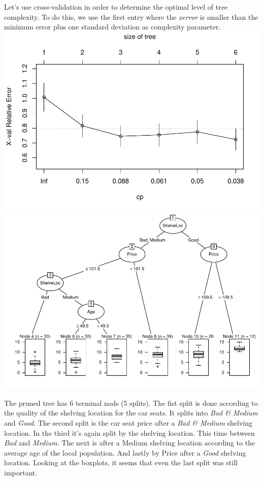 \documentclass[
]{article}
\begin{document}
Let's use cross-validation in order to determine the optimal level of
tree complexity. To do this, we use the first entry where the
\textit{xerror} is smaller than the minimum error plus one standard
deviation as complexity parameter.
\includegraphics{A3_files/figure-latex/unnamed-chunk-8-1.pdf}
\includegraphics{A3_files/figure-latex/unnamed-chunk-8-2.pdf}

The pruned tree has 6 terminal nods (5 splits). The fist split is done
according to the quality of the shelving location for the car seats. It
splits into \textit{Bad \& Medium} and \textit{Good}. The second split
is the car seat price after a \textit{Bad \& Medium} shelving location.
In the third it's again split by the shelving location. This time
between \textit{Bad} and \textit{Medium}. The next is after a Medium
shelving location according to the average age of the local population.
And lastly by Price after a \textit{Good} shelving location. Looking at
the boxplots, it seems that even the last split was still important.
\end{document}

